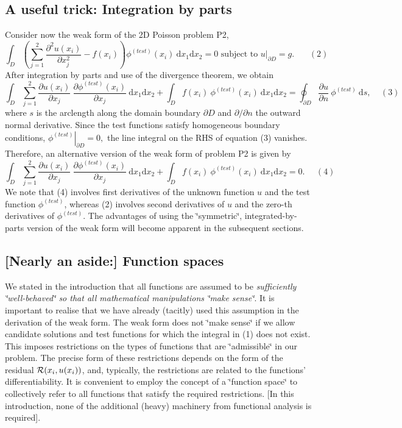 \hypertarget{index_int_by_parts_1}{}\subsection{A useful trick\-: Integration by parts}\label{index_int_by_parts_1}
Consider now the weak form of the 2\-D Poisson problem P2, \[ \int_D \left( \sum_{j=1}^2 \frac{\partial^2 u(x_i)}{\partial x_j^2} - f(x_i) \right) \phi^{(test)}(x_i) \ \mbox{d}x_1 \mbox{d}x_2 =0 \mbox{\ \ \ \ subject to\ \ \ \ } u|_{\partial D}=g. \ \ \ \ \ \ \ \ (2) \] After integration by parts and use of the divergence theorem, we obtain \[ \int_D \sum_{j=1}^2 \frac{\partial u(x_i)}{\partial x_j} \ \frac{\partial \phi^{(test)}(x_i)}{\partial x_j} \ \mbox{d}x_1 \mbox{d}x_2 + \int_D f(x_i) \ \phi^{(test)}(x_i) \ \mbox{d}x_1 \mbox{d}x_2 = \oint_{\partial D} \frac{\partial u}{\partial n} \ \phi^{(test)} \ \mbox{d}s, \ \ \ \ \ (3) \] where $s$ is the arclength along the domain boundary $ \partial D$ and $ \partial/\partial n$ the outward normal derivative. Since the test functions satisfy homogeneous boundary conditions, $ \left. \phi^{(test)} \right|_{\partial D} = 0, $ the line integral on the R\-H\-S of equation (3) vanishes. Therefore, an alternative version of the weak form of problem P2 is given by \[ \int_D \sum_{j=1}^2 \frac{\partial u(x_i)}{\partial x_j} \ \frac{\partial \phi^{(test)}(x_i)}{\partial x_j} \ \mbox{d}x_1 \mbox{d}x_2 + \int_D f(x_i) \ \phi^{(test)}(x_i) \ \mbox{d}x_1 \mbox{d}x_2 = 0. \ \ \ \ \ \ (4) \] We note that (4) involves first derivatives of the unknown function $ u $ and the test function $ \phi^{(test)} $, whereas (2) involves second derivatives of $ u $ and the zero-\/th derivatives of $ \phi^{(test)} $. The advantages of using the \char`\"{}symmetric\char`\"{}, integrated-\/by-\/parts version of the weak form will become apparent in the subsequent sections.



\hypertarget{index_function_spaces}{}\subsection{\mbox{[}\-Nearly an aside\-:\mbox{]} Function spaces}\label{index_function_spaces}
We stated in the introduction that all functions are assumed to be {\itshape  sufficiently \char`\"{}well-\/behaved\char`\"{} so that all mathematical manipulations \char`\"{}make sense\char`\"{}}. It is important to realise that we have already (tacitly) used this assumption in the derivation of the weak form. The weak form does not \char`\"{}make sense\char`\"{} if we allow candidate solutions and test functions for which the integral in (1) does not exist. This imposes restrictions on the types of functions that are \char`\"{}admissible\char`\"{} in our problem. The precise form of these restrictions depends on the form of the residual ${\cal R}(x_i,u(x_i))$, and, typically, the restrictions are related to the functions' differentiability. It is convenient to employ the concept of a \char`\"{}function space\char`\"{} to collectively refer to all functions that satisfy the required restrictions. \mbox{[}In this introduction, none of the additional (heavy) machinery from functional analysis is required\mbox{]}.

